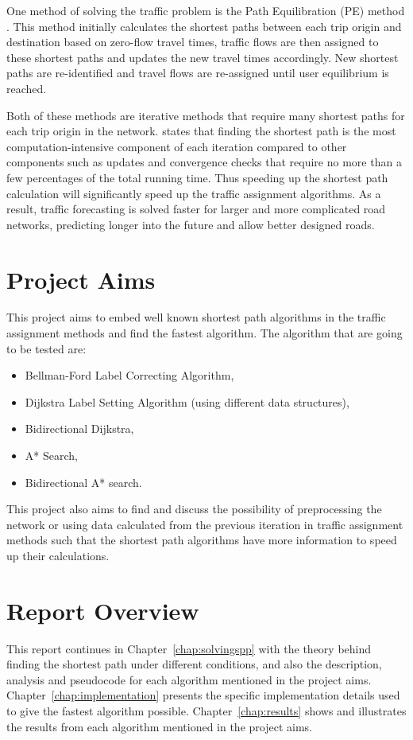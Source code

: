 One method of solving the traffic problem is the Path Equilibration (PE) method \citep{Florian}.
This method initially calculates the shortest paths between each trip origin and destination based on zero-flow travel times, 
traffic flows are then assigned to these shortest paths and updates the new travel times accordingly.
New shortest paths are re-identified and travel flows are re-assigned until
user equilibrium is reached.


Both of these methods are iterative methods that require many shortest paths for each trip origin in the network.
\citet{Sheffi} states that finding the shortest path is the most computation-intensive component of each iteration compared to other components such as updates and convergence checks that require no more than a few percentages of the total running time.
Thus speeding up the shortest path calculation will significantly speed up the traffic assignment algorithms.
As a result,
traffic forecasting is solved faster for larger and more complicated road networks, predicting longer into the future and allow better designed roads.

\section{Project Aims}
This project aims to embed well known shortest path algorithms in the traffic assignment methods and find the fastest algorithm.
The algorithm that are going to be tested are:
\begin{itemize}
    \item Bellman-Ford Label Correcting Algorithm,
    \item Dijkstra Label Setting Algorithm (using different data structures),
    \item Bidirectional Dijkstra,
    \item A* Search,
    \item Bidirectional A* search.
\end{itemize}

This project also aims to find and discuss the possibility of preprocessing the network or using data calculated from the previous iteration in traffic assignment methods such that the shortest path algorithms have more information to speed up their calculations.

\section{Report Overview}
This report continues in Chapter~\ref{chap:solvingspp} with the theory behind finding the shortest path under different conditions,
and also the description, analysis and pseudocode for each algorithm mentioned in the project aims.
Chapter~\ref{chap:implementation} presents the specific implementation details used to give the fastest algorithm possible.
Chapter~\ref{chap:results} shows and illustrates the results from each algorithm mentioned in the project aims.


